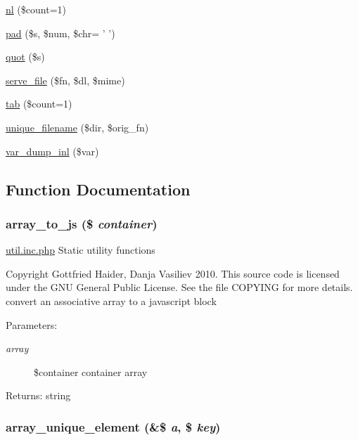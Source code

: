 \begin{CompactItemize}
\hyperlink{util_8inc_8php_9f9eeab2eb9a39518e80609fc7f83842}{nl} (\$count=1)
\item 
\hyperlink{util_8inc_8php_37ef346387afe0af2cf86a8bea887173}{pad} (\$s, \$num, \$chr= ' ')
\item 
\hyperlink{util_8inc_8php_3c7d87c658499c1559a6b98cac06f58d}{quot} (\$s)
\item 
\hyperlink{util_8inc_8php_9d3ab20fc8b79fb6ab860f93600c745e}{serve\_\-file} (\$fn, \$dl, \$mime)
\item 
\hyperlink{util_8inc_8php_74e38925e7162356a2ea14db32664c37}{tab} (\$count=1)
\item 
\hyperlink{util_8inc_8php_187670bae118aa2d4864c513a21e712d}{unique\_\-filename} (\$dir, \$orig\_\-fn)
\item 
\hyperlink{util_8inc_8php_a5cc9d5f8a0b5bb76dfe3d15796e5940}{var\_\-dump\_\-inl} (\$var)
\end{CompactItemize}


\subsection{Function Documentation}
\hypertarget{util_8inc_8php_61d3b2881d9368741c71509017724bc8}{
\subsubsection[{array\_\-to\_\-js}]{\setlength{\rightskip}{0pt plus 5cm}array\_\-to\_\-js (\$ {\em container})}}
\label{util_8inc_8php_61d3b2881d9368741c71509017724bc8}


\hyperlink{util_8inc_8php}{util.inc.php} Static utility functions

Copyright Gottfried Haider, Danja Vasiliev 2010. This source code is licensed under the GNU General Public License. See the file COPYING for more details. convert an associative array to a javascript block

\begin{Desc}
\item[Parameters:]
\begin{description}
\item[{\em array}]\$container container array \end{description}
\end{Desc}
\begin{Desc}
\item[Returns:]string \end{Desc}
\hypertarget{util_8inc_8php_4647462c98447c6c2842f70d8c313f85}{
\subsubsection[{array\_\-unique\_\-element}]{\setlength{\rightskip}{0pt plus 5cm}array\_\-unique\_\-element (\&\$ {\em a}, \/  \$ {\em key})}}
\label{util_8inc_8php_4647462c98447c6c2842f70d8c313f85}


